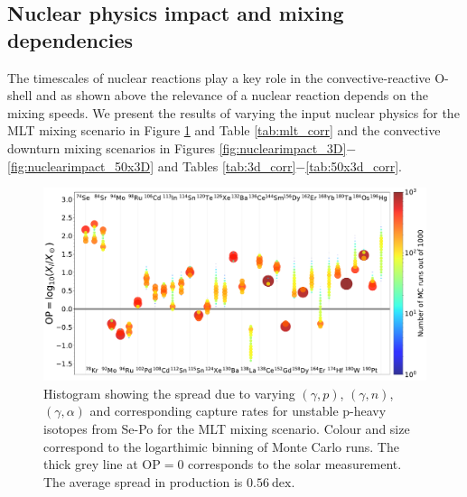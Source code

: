 \subsection{Nuclear physics impact and mixing dependencies}\label{sec:nuclearimpact}

The timescales of nuclear reactions play a key role in the convective-reactive O-shell and as shown above the relevance of a nuclear reaction depends on the mixing speeds.
We present the results of varying the input nuclear physics for the MLT mixing scenario in Figure \ref{fig:nuclearimpact_MLT} and Table \ref{tab:mlt_corr} and the convective downturn mixing scenarios in Figures \ref{fig:nuclearimpact_3D}$-$\ref{fig:nuclearimpact_50x3D} and Tables \ref{tab:3d_corr}$-$\ref{tab:50x3d_corr}.

\begin{figure}
\includegraphics[width=\textwidth]{chapters/2/figures/nuclearimpact_MLT.pdf}
\caption{Histogram showing the spread due to varying $(\gamma,p)$, $(\gamma,n)$, $(\gamma,\alpha)$ and corresponding capture rates for unstable p-heavy isotopes from Se-Po for the MLT mixing scenario. Colour and size correspond to the logarthimic binning of Monte Carlo runs. The thick grey line at $\mathrm{OP} = 0$ corresponds to the solar measurement. The average spread in production is $0.56~\mathrm{dex}$.
\label{fig:nuclearimpact_MLT}}
\end{figure}

